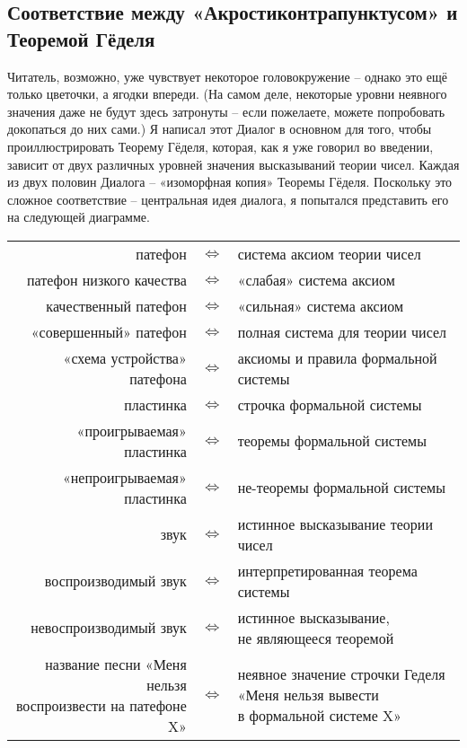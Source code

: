 \documentclass[../main.tex]{subfiles}
\begin{document}
\subsection{Соответствие между «Акростиконтрапунктусом» и Теоремой Гёделя}

Читатель, возможно, уже чувствует некоторое головокружение \--- однако это ещё только цветочки, а ягодки впереди. (На самом деле, некоторые уровни неявного значения даже не будут здесь затронуты \--- если пожелаете, можете попробовать докопаться до них сами.) Я написал этот Диалог в основном для того, чтобы проиллюстрировать Теорему Гёделя, которая, как я уже говорил во введении, зависит от двух различных уровней значения высказываний теории чисел. Каждая из двух половин Диалога \--- «изоморфная копия» Теоремы Гёделя. Поскольку это сложное соответствие \--- центральная идея диалога, я попытался представить его на следующей диаграмме.

\begingroup
\setlength{\tabcolsep}{6pt}
\begin{longtable}{rcl}
    патефон &$\Longleftrightarrow$& система аксиом теории чисел \\
    патефон низкого качества &$\Longleftrightarrow$& «слабая» система аксиом \\
    качественный патефон &$\Longleftrightarrow$& «сильная» система аксиом \\
    «совершенный» патефон &$\Longleftrightarrow$& полная система для теории чисел \\
    «схема устройства» патефона &$\Longleftrightarrow$& аксиомы и правила формальной системы \\
    пластинка &$\Longleftrightarrow$& строчка формальной системы \\
    «проигрываемая» пластинка &$\Longleftrightarrow$& теоремы формальной системы \\
    «непроигрываемая» пластинка &$\Longleftrightarrow$& не-теоремы формальной системы \\
    звук &$\Longleftrightarrow$& истинное высказывание теории чисел \\
    воспроизводимый звук &$\Longleftrightarrow$& интерпретированная теорема системы \\
    невоспроизводимый звук &$\Longleftrightarrow$& \makecell[lt]{истинное высказывание, \\ не являющееся теоремой} \\
    \makecell[rt]{название песни «Меня нельзя \\ воспроизвести на патефоне X»} &$\Longleftrightarrow$& \makecell[lt]{неявное значение строчки Геделя \\ «Меня нельзя вывести \\ в формальной системе X»} \\
\end{longtable}
\endgroup
\end{document}
